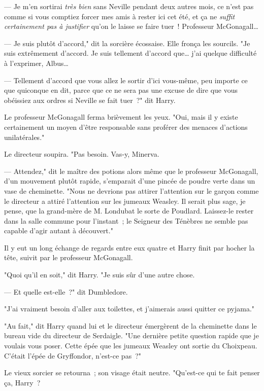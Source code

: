 --- Je m'en sortirai \emph{très bien} sans Neville pendant deux autres mois, ce n'est pas comme si vous comptiez forcer mes amis à rester ici cet été, et ça ne \emph{suffit certainement pas à justifier} qu'on le laisse se faire tuer~! Professeur McGonagall…

--- Je suis plutôt d'accord," dit la sorcière écossaise. Elle fronça les sourcils. "Je suis extrêmement d'accord. Je suis tellement d'accord que… j'ai quelque difficulté à l'exprimer, Albus…

--- Tellement d'accord que vous allez le sortir d'ici vous-même, peu importe ce que quiconque en dit, parce que ce ne sera pas une excuse de dire que vous obéissiez aux ordres si Neville se fait tuer~?" dit Harry.

Le professeur McGonagall ferma brièvement les yeux. "Oui, mais il y existe certainement un moyen d'être responsable sans proférer des menaces d'actions unilatérales."

Le directeur soupira. "Pas besoin. Vas-y, Minerva.

--- Attendez," dit le maître des potions alors même que le professeur McGonagall, d'un mouvement plutôt rapide, s'emparait d'une pincée de poudre verte dans un vase de cheminette. "Nous ne devrions pas attirer l'attention sur le garçon comme le directeur a attiré l'attention sur les jumeaux Weasley. Il serait plus sage, je pense, que la grand-mère de M. Londubat le sorte de Poudlard. Laissez-le rester dans la salle commune pour l'instant~; le Seigneur des Ténèbres ne semble pas capable d'agir autant à découvert."

Il y eut un long échange de regards entre eux quatre et Harry finit par hocher la tête, suivit par le professeur McGonagall.

"Quoi qu'il en soit," dit Harry. "Je suis sûr d'une autre chose.

--- Et quelle est-elle~?" dit Dumbledore.

"J'ai vraiment besoin d'aller aux toilettes, et j'aimerais aussi quitter ce pyjama."

\later

"Au fait," dit Harry quand lui et le directeur émergèrent de la cheminette dans le bureau vide du directeur de Serdaigle. "Une dernière petite question rapide que je voulais vous poser. Cette épée que les jumeaux Weasley ont sortie du Choixpeau. C'était l'épée de Gryffondor, n'est-ce pas~?"

Le vieux sorcier se retourna~; son visage était neutre. "Qu'est-ce qui te fait penser ça, Harry~?

